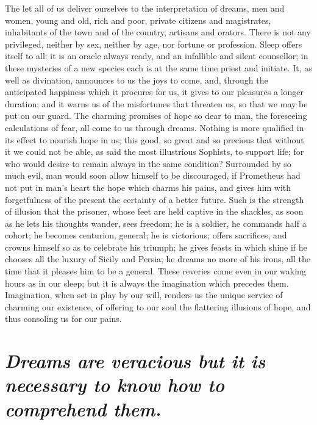 \documentclass[12pt]{article}
\begin{document}
The let all of us deliver ourselves to the interpretation of dreams, men and
women, young and old, rich and poor, private citizens and magistrates,
inhabitants of the town and of the country, artisans and orators. There is not
any privileged, neither by sex, neither by age, nor fortune or profession.
Sleep offers itself to all: it is an oracle always ready, and an infallible and
silent counsellor; in these mysteries of a new species each is at the same time
priest and initiate. It, as well as divination, announces to us the joys to
come, and, through the anticipated happiness which it procures for us, it gives
to our pleasures a longer duration; and it warns us of the misfortunes that
threaten us, so that we may be put on our guard. The charming promises of hope
so dear to man, the foreseeing calculations of fear, all come to us through
dreams. Nothing is more qualified in its effect to nourish hope in us; this
good, so great and so precious that without it we could not be able, as said
the most illustrious Sophists, to support life; for who would desire to remain
always in the same condition? Surrounded by so much evil, man would soon allow
himself to be discouraged, if Prometheus had not put in man's heart the hope
which charms his pains, and gives him with forgetfulness of the present the
certainty of a better future. Such is the strength of illusion that the
prisoner, whose feet are held captive in the shackles, as soon as he lets his
thoughts wander, sees freedom; he is a soldier, he commands half a cohort; he
becomes centurion, general; he is victorious; offers sacrifices, and crowns
himself so as to celebrate his triumph; he gives feasts in which shine if he
chooses all the luxury of Sicily and Persia; he dreams no more of his irons,
all the time that it pleases him to be a general. These reveries come even in
our waking hours as in our sleep; but it is always the imagination which
precedes them. Imagination, when set in play by our will, renders us the unique
service of charming our existence, of offering to our soul the flattering
illusions of hope, and thus consoling us for our pains.


\section{\mdseries\itshape Dreams are veracious but it is necessary to know how
to comprehend them.}
\end{document}
